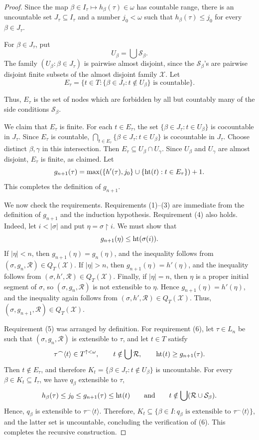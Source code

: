 \begin{proof}
Since the map $\beta\in I_\tau\longmapsto h_\beta(\tau)\in\omega$
has countable range, there is an uncountable set $J_\tau\subseteq I_\tau$ and a number
$j_0<\omega$ such that $h_\beta(\tau)\leq j_0$ for every $\beta\in J_\tau$.

For $\beta\in J_\tau$, put
\[
  U_\beta=\bigcup\mathcal S_\beta.
\]
The family $(U_\beta:\beta\in J_\tau)$ is pairwise almost disjoint, since the
$\mathcal S_\beta$'s are pairwise disjoint finite subsets of the almost
disjoint family $\mathcal X$.
Let
\[
  E_\tau=
  \{t\in T:\{\beta\in J_\tau:t\notin U_\beta\}\text{ is countable}\}.
\]

Thus, $E_\tau$ is the set of nodes which are forbidden by all but countably many
of the side conditions $\mathcal S_\beta$.

We claim that $E_\tau$ is finite.
For each $t\in E_\tau$, the set $\{\beta\in J_\tau:t\in U_\beta\}$
is cocountable in $J_\tau$.
Since $E_\tau$ is countable, $\bigcap_{t\in E_\tau}\{\beta\in J_\tau:t\in U_\beta\}$ is cocountable in $J_\tau$.
Choose distinct
$\beta,\gamma$ in this intersection.
Then $E_\tau\subseteq U_\beta\cap U_\gamma$.
Since $U_\beta$ and $U_\gamma$ are almost disjoint, $E_\tau$ is finite, as claimed.
Let
\[
  g_{n+1}(\tau)=\max(\{h'(\tau), j_0\}\cup\{\operatorname{ht}(t):t\in E_\tau\})+1.
\]
This completes the definition of $g_{n+1}$.

We now check the requirements.  Requirements (1)--(3) are immediate from the
definition of $g_{n+1}$ and the induction hypothesis.  Requirement (4) also
holds.
Indeed, let $i<|\sigma|$ and put $\eta=\sigma\restriction i$.
We must show that
\[
  g_{n+1}(\eta)\leq \operatorname{ht}(\sigma(i)).
\]
If $|\eta|<n$, then $g_{n+1}(\eta)=g_n(\eta)$, and the inequality follows from
$(\sigma,g_n,\mathcal R)\in Q_T(\mathcal X)$.
If $|\eta|>n$, then $g_{n+1}(\eta)=h'(\eta)$, and the inequality follows from
$(\sigma,h',\mathcal R)\in Q_T(\mathcal X)$.
Finally, if $|\eta|=n$, then $\eta$ is a proper initial segment of $\sigma$,
so $(\sigma,g_n,\mathcal R)$ is not extensible to $\eta$. Hence
$g_{n+1}(\eta)=h'(\eta)$, and the inequality again follows from
$(\sigma,h',\mathcal R)\in Q_T(\mathcal X)$.
Thus, $(\sigma,g_{n+1},\mathcal R)\in Q_T(\mathcal X)$.

Requirement (5) was arranged by definition.  For requirement (6), let
$\tau\in L_n$ be such that $(\sigma,g_n,\mathcal R)$ is extensible to $\tau$,
and let $t\in T$ satisfy
\[
  \tau^\frown\langle t\rangle\in T^{\uparrow<\omega},
  \qquad
  t\notin\bigcup\mathcal R,
  \qquad
  \operatorname{ht}(t)\geq g_{n+1}(\tau).
\]
Then $t\notin E_\tau$, and therefore $K_t=\{\beta\in J_\tau:t\notin U_\beta\}$ is uncountable.
For every $\beta\in K_t\subseteq I_\tau$, we have $q_\beta$ extensible to
$\tau$,
\[
  h_\beta(\tau)\leq j_0\leq g_{n+1}(\tau)\leq\operatorname{ht}(t) \qquad\text{and}\qquad
    t\notin\bigcup(\mathcal R\cup\mathcal S_\beta).
\]
Hence, $q_\beta$ is extensible to $\tau^\frown\langle t\rangle$.
Therefore, $K_t\subseteq\{\beta\in I:q_\beta\text{ is extensible to }\tau^\frown\langle t\rangle\}$, and the latter set is uncountable, concluding the verification of (6).
This completes the recursive construction.


\end{proof}
